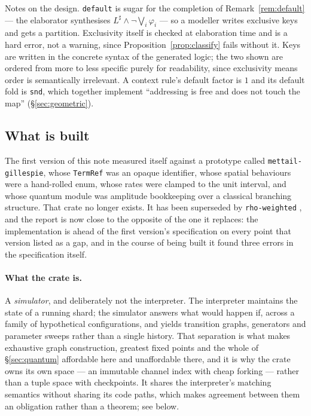 \documentclass[11pt,a4paper]{article}
\theoremstyle{plain}
\theoremstyle{definition}
\theoremstyle{remark}
\begin{document}
Notes on the design. \texttt{default} is sugar for the completion of
Remark~\ref{rem:default} --- the elaborator synthesises
$L^\sharp \wedge \neg\bigvee_i \varphi_i$ --- so a modeller writes exclusive keys and gets a
partition. Exclusivity itself is checked at elaboration time and is a hard error, not a warning,
since Proposition~\ref{prop:classify} fails without it. Keys are written in the concrete syntax of
the generated logic; the two shown are ordered from more to less specific purely for readability,
since exclusivity means order is semantically irrelevant. A context rule's default factor is
$1$ and its default fold is \texttt{snd}, which together implement ``addressing is free and does not
touch the map'' (\S\ref{sec:geometric}).

\subsection{What is built}
\label{sec:built}

The first version of this note measured itself against a prototype called \texttt{mettail-gillespie},
whose \texttt{TermRef} was an opaque identifier, whose spatial behaviours were a hand-rolled enum,
whose rates were clamped to the unit interval, and whose quantum module was amplitude bookkeeping
over a classical branching structure. That crate no longer exists. It has been superseded by
\texttt{rho-weighted} \cite{gillespie-crate}, and the report is now close to the opposite of the one
it replaces: the implementation is ahead of the first version's specification on every point that
version listed as a gap, and in the course of being built it found three errors in the specification
itself.

\paragraph{What the crate is.} A \emph{simulator}, and deliberately not the interpreter. The
interpreter maintains the state of a running shard; the simulator answers what would happen if,
across a family of hypothetical configurations, and yields transition graphs, generators and
parameter sweeps rather than a single history. That separation is what makes exhaustive graph
construction, greatest fixed points and the whole of \S\ref{sec:quantum} affordable here and
unaffordable there, and it is why the crate owns its own space --- an immutable channel index with
cheap forking --- rather than a tuple space with checkpoints. It shares the interpreter's matching
semantics without sharing its code paths, which makes agreement between them an obligation rather
than a theorem; see below.
\end{document}
